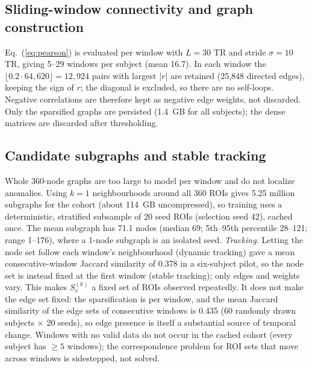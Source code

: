 \documentclass[conference]{IEEEtran}
\begin{document}
\subsection{Sliding-window connectivity and graph construction}
Eq.~(\ref{eq:pearson}) is evaluated per window with $L{=}30$ TR and stride $\sigma{=}10$ TR, giving 5--29 windows per subject (mean 16.7). In each window the $\lfloor 0.2\cdot 64{,}620\rfloor=12{,}924$ pairs with largest $|r|$ are retained (25,848 directed edges), keeping the sign of $r$; the diagonal is excluded, so there are no self-loops. Negative correlations are therefore kept as negative edge weights, not discarded. Only the sparsified graphs are persisted (1.4~GB for all subjects); the dense matrices are discarded after thresholding.

\subsection{Candidate subgraphs and stable tracking}
Whole 360-node graphs are too large to model per window and do not localize anomalies. Using $k{=}1$ neighbourhoods around all 360 ROIs gives 5.25 million subgraphs for the cohort (about 114~GB uncompressed), so training uses a deterministic, stratified subsample of 20 seed ROIs (selection seed 42), cached once. The mean subgraph has 71.1 nodes (median 69; 5th--95th percentile 28--121; range 1--176), where a 1-node subgraph is an isolated seed. \emph{Tracking.} Letting the node set follow each window's neighbourhood (dynamic tracking) gave a mean consecutive-window Jaccard similarity of 0.378 in a six-subject pilot, so the node set is instead fixed at the first window (stable tracking); only edges and weights vary. This makes $S_v^{(k)}$ a fixed set of ROIs observed repeatedly. It does not make the edge set fixed: the sparsification is per window, and the mean Jaccard similarity of the edge sets of consecutive windows is 0.435 (60 randomly drawn subjects $\times$ 20 seeds), so edge presence is itself a substantial source of temporal change. Windows with no valid data do not occur in the cached cohort (every subject has $\geq5$ windows); the correspondence problem for ROI sets that move across windows is sidestepped, not solved.
\end{document}

